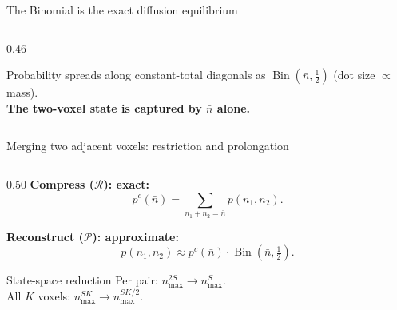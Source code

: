 \documentclass[10pt,aspectratio=169]{beamer}
\newcommand{\Bin}{\operatorname{Bin}}
\newcommand{\calR}{\mathcal{R}}
\newcommand{\calP}{\mathcal{P}}
\begin{document}
\begin{frame}{The Binomial is the exact diffusion equilibrium}
\begin{columns}[T]
\begin{column}{0.46\textwidth}
\begin{center}
      \vspace{0.4em}
      {\footnotesize
        Probability spreads along constant-total diagonals
        as $\Bin(\bar n,\tfrac12)$ (dot size $\propto$ mass).\\[0.3em]
        \textbf{The two-voxel state is captured by $\bar n$ alone.}
      }
      \end{center}
    \end{column}
  \end{columns}

\end{frame}


\begin{frame}{Merging two adjacent voxels: restriction and prolongation}

  \begin{columns}[T]
    \begin{column}{0.50\textwidth}
      \textbf{Compress ($\calR$): exact:}
      \[ p^c(\bar n) = \!\!\sum_{n_1 + n_2 = \bar n}\!\! p(n_1, n_2). \]

      \textbf{Reconstruct ($\calP$): approximate:}
      \[ p(n_1, n_2) \approx p^c(\bar n)\cdot\Bin(\bar n,\tfrac{1}{2}). \]

      \begin{block}{State-space reduction}
        Per pair: $n_{\max}^{2S} \to n_{\max}^{S}$.\\
        All $K$ voxels: $n_{\max}^{SK} \to n_{\max}^{SK/2}$.
      \end{block}


\end{column}
\end{columns}
\end{frame}
\end{document}
